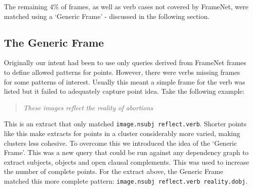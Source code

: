       The remaining 4\% of frames, as well as verb cases not covered by FrameNet, were matched using a `Generic Frame' - discussed in the following section.

    \tocless\subsection{The Generic Frame}
      Originally our intent had been to use only queries derived from FrameNet frames to define allowed patterns for points. However, there were verbs missing frames for some patterns of interest. Usually this meant a simple frame for the verb was listed but it failed to adequately capture point idea. Take the following example:

      \bigskip
      \begin{center}
        \blockquote{\textit{These images reflect the reality of abortions}}
      \end{center}

      This is an extract that only matched \texttt{image.nsubj reflect.verb}. Shorter points like this make extracts for points in a cluster considerably more varied, making clusters less cohesive. To overcome this we introduced the idea of the `Generic Frame'. This was a new query that could be run against any dependency graph to extract subjects, objects and open clausal complements. This was used to increase the number of complete points. For the extract above, the Generic Frame matched this more complete pattern: \texttt{image.nsubj reflect.verb reality.dobj}.


